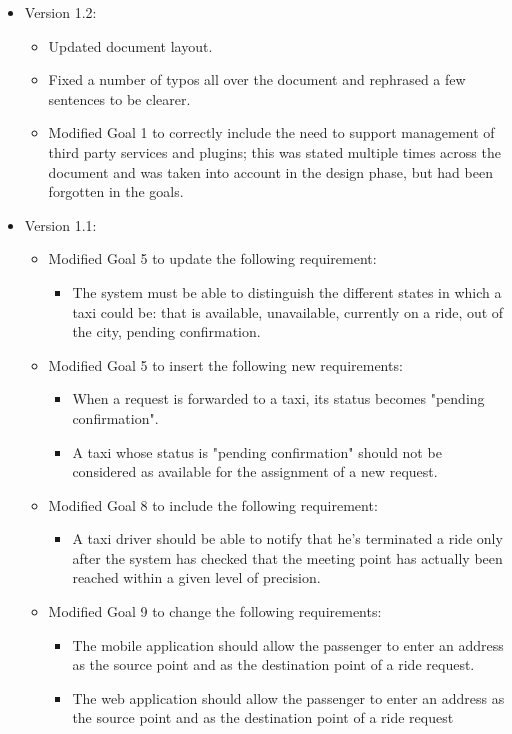 \begin{itemize}
	\item Version 1.2:
	\begin{itemize}
		\item Updated document layout.
		\item Fixed a number of typos all over the document and rephrased a few sentences to be clearer. 
		\item Modified Goal 1 to correctly include the need to support management of third party services and plugins; this was stated multiple times across the document and was taken into account in the design phase, but had been forgotten in the goals.
	\end{itemize}
	\item Version 1.1:
	\begin{itemize}
	\item Modified Goal 5 to update the following requirement:
	\begin{itemize}
	\item The system must be able to distinguish the different states in which a taxi could be: that is available, unavailable, currently on a ride, out of the city, pending confirmation.
	\end{itemize}
	\item Modified Goal 5 to insert the following new requirements:
	\begin{itemize}
		\item When a request is forwarded to a taxi, its status becomes "pending confirmation". 
		\item A taxi whose status is "pending confirmation" should not be considered as available for the assignment of a new request.
	\end{itemize}
	\item Modified Goal 8 to include the following requirement: 
	\begin{itemize}
	\item A taxi driver should be able to notify that he's terminated a ride only after the system has checked that the meeting point has actually been reached within a given level of precision.
	\end{itemize}
	\item Modified Goal 9 to change the following requirements:
	\begin{itemize}
	\item The mobile application should allow the passenger to enter an address as the source point and as the destination point of a ride request.
	\item The web application should allow the passenger to enter an address as the source point and as the destination point of a ride request

\end{itemize}
\end{itemize}
\end{itemize}
